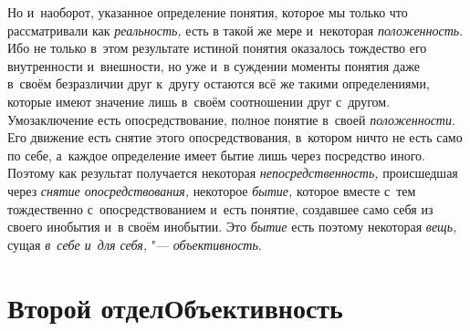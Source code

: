 Но и~наоборот, указанное определение понятия, которое мы
только что рассматривали как {\em реальность,} есть в
такой же мере и~некоторая {\em положенность}. Ибо
не только в~этом результате истиной понятия оказалось тождество его
внутренности и~внешности, но уже и~в суждении моменты понятия даже в~своём
безразличии друг к~другу остаются всё же такими определениями, которые
имеют значение лишь в~своём соотношении друг с~другом. Умозаключение есть
опосредствование, полное понятие в~своей {\em положенности}. Его
движение есть снятие этого опосредствования, в~котором ничто не есть само
по себе, а~каждое определение имеет бытие лишь через посредство иного.
Поэтому как результат получается некоторая {\em непосредственность,}
происшедшая через {\em снятие опосредствования,} некоторое {\em бытие,}
которое вместе с~тем тождественно с~опосредствованием и~есть
понятие, создавшее само себя из своего инобытия и~в своём инобытии. Это
{\em бытие} есть поэтому некоторая {\em вещь,} сущая {\em в~себе и~для
себя,} "--- {\em объективность}.

\bigskip
\clearpage

\part[Второй отдел\texorpdfstring{\newline}{} ОБЪЕКТИВНОСТЬ]{Второй отдел\newline Объективность}

